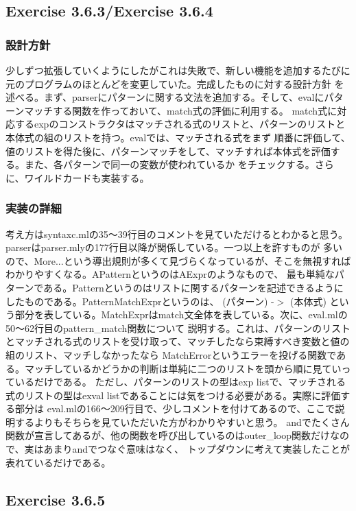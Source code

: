 \documentclass{jarticle}
\begin{document}
\subsection{Exercise 3.6.3/Exercise 3.6.4}
\subsubsection{設計方針}
少しずつ拡張していくようにしたがこれは失敗で、新しい機能を追加するたびに元のプログラムのほとんどを変更していた。完成したものに対する設計方針
を述べる。まず、parserにパターンに関する文法を追加する。そして、evalにパターンマッチする関数を作っておいて、match式の評価に利用する。
match式に対応するexpのコンストラクタはマッチされる式のリストと、パターンのリストと本体式の組のリストを持つ。evalでは、マッチされる式をまず
順番に評価して、値のリストを得た後に、パターンマッチをして、マッチすれば本体式を評価する。また、各パターンで同一の変数が使われているか
をチェックする。さらに、ワイルドカードも実装する。
\subsubsection{実装の詳細}
考え方はsyntaxc.mlの35〜39行目のコメントを見ていただけるとわかると思う。parserはparser.mlyの177行目以降が関係している。一つ以上を許すものが
多いので、More...という導出規則が多くて見づらくなっているが、そこを無視すればわかりやすくなる。APatternというのはAExprのようなもので、
最も単純なパターンである。Patternというのはリストに関するパターンを記述できるようにしたものである。PatternMatchExprというのは、
(パターン) -$>$ (本体式) という部分を表している。MatchExprはmatch文全体を表している。次に、eval.mlの50〜62行目のpattern\_match関数について
説明する。これは、パターンのリストとマッチされる式のリストを受け取って、マッチしたなら束縛すべき変数と値の組のリスト、マッチしなかったなら
MatchErrorというエラーを投げる関数である。マッチしているかどうかの判断は単純に二つのリストを頭から順に見ていっているだけである。
ただし、パターンのリストの型はexp listで、マッチされる式のリストの型はexval listであることには気をつける必要がある。実際に評価する部分は
eval.mlの166〜209行目で、少しコメントを付けてあるので、ここで説明するよりもそちらを見ていただいた方がわかりやすいと思う。
andでたくさん関数が宣言してあるが、他の関数を呼び出しているのはouter\_loop関数だけなので、実はあまりandでつなぐ意味はなく、
トップダウンに考えて実装したことが表れているだけである。

\subsection{Exercise 3.6.5}
\end{document}
